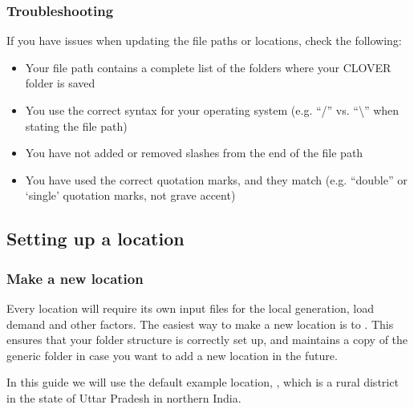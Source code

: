 \documentclass[letterpaper,10pt,english]{sphinxmanual}
\begin{document}
\subsubsection{Troubleshooting}
\label{\detokenize{general_setup:troubleshooting}}
\sphinxAtStartPar
If you have issues when updating the file paths or locations, check the
following:
\begin{itemize}
\item {} 
\sphinxAtStartPar
Your file path contains a complete list of the folders where your CLOVER folder is saved

\item {} 
\sphinxAtStartPar
You use the correct syntax for your operating system (e.g. “/” vs. “\textbackslash{}” when stating the file path)

\item {} 
\sphinxAtStartPar
You have not added or removed slashes from the end of the file path

\item {} 
\sphinxAtStartPar
You have used the correct quotation marks, and they match (e.g. “double” or ‘single’ quotation marks, not \textasciigrave{}grave accent\textasciigrave{})

\end{itemize}


\subsection{Setting up a location}
\label{\detokenize{general_setup:setting-up-a-location}}

\subsubsection{Make a new location}
\label{\detokenize{general_setup:make-a-new-location}}
\sphinxAtStartPar
Every location will require its own input files for the local
generation, load demand and other factors. The easiest way to make a new
location is to . This ensures that your folder
structure is correctly set up, and maintains a copy of the generic
folder in case you want to add a new location in the future.

\sphinxAtStartPar
In this guide we will use the default example location, ,
which is a rural district in the state of Uttar Pradesh in northern
India.
\end{document}
